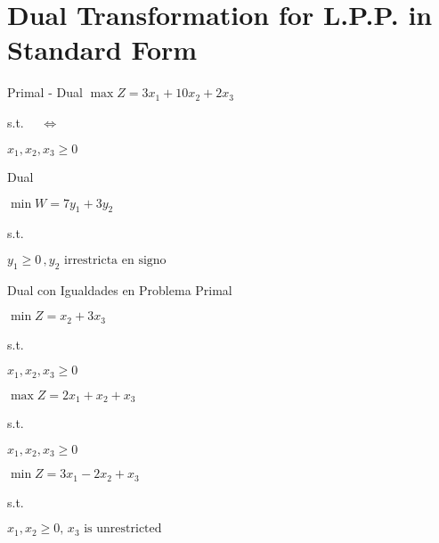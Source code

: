 \section{Dual Transformation for L.P.P. in Standard Form}
\label{sec:standard-form}


\begin{frameExample}{Primal - Dual}{}
   $  \max Z = 3x_1+ 10x_2 + 2x_3 $
  
  s.t. $\quad \Leftrightarrow \quad$

$x_1, x_2, x_3  \geq 0 $
\vspace{3mm}
\begin{block}{Dual}
  
  $\min W = 7y_1 + 3y_2 $

                  s.t.  %
  
  $    y_1\geq 0 \, , y_2 \text{ irrestricta en signo}$
\end{block}
\end{frameExample}


\begin{frameExample}{Dual con Igualdades en Problema Primal}
  
  $\min Z = x_2 + 3x_3$

  s.t.


  $x_1, x_2, x_3 \geq 0$
\end{frameExample}

\begin{frameExample}{}

  $\max Z = 2x_1 + x_2 + x_3$

  s.t.


  $x_1, x_2, x_3 \geq 0$

  
\end{frameExample}

\begin{frameExample}{}

  $\min Z = 3x_1 - 2x_2 + x_3$

  s.t.


  $x_1, x_2\geq 0, \, x_3 \text{  is unrestricted} $

  
\end{frameExample}


